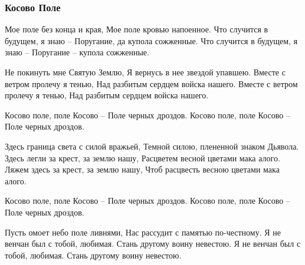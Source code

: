  
 
 

\subsubsection{Косово Поле}

Мое поле без конца и края,
Мое поле кровью напоенное.
Что случится в будущем, я знаю –
Поругание, да купола сожженные.
Что случится в будущем, я знаю –
Поругание – купола сожженные.

Не покинуть мне Святую Землю,
Я вернусь в нее звездой упавшею.
Вместе с ветром пролечу я тенью,
Над разбитым сердцем войска нашего.
Вместе с ветром пролечу я тенью,
Над разбитым сердцем войска нашего.

Косово поле, поле Косово –
Поле черных дроздов.
Косово поле, поле Косово –
Поле черных дроздов.

Здесь граница света с силой вражьей,
Темной силою, плененной знаком Дьявола.
Здесь легли за крест, за землю нашу,
Расцветем весной цветами мака алого.
Ляжем здесь за крест, за землю нашу,
Чтоб расцвесть весною цветами мака алого.

Косово поле, поле Косово –
Поле черных дроздов.
Косово поле, поле Косово –
Поле черных дроздов.

Пусть омоет небо поле ливнями,
Нас рассудит с памятью по-честному.
Я не венчан был с тобой, любимая.
Стань другому воину невестою.
Я не венчан был с тобой, любимая.
Стань другому воину невестою.
